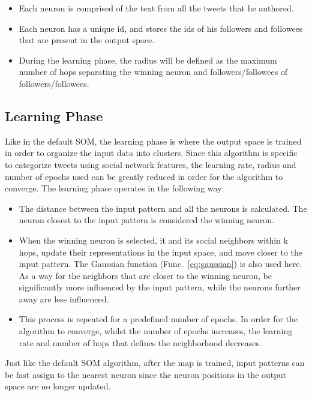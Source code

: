 \begin{itemize}
  \item Each neuron is comprised of the text from all the tweets that he authored.
  \item Each neuron has a unique id, and stores the ids of his followers and followees that are present in the output space.
  \item During the learning phase, the radius will be defined as the maximum number of hops separating the winning neuron and followers/followees of followers/followees. 
\end{itemize}


\subsection{Learning Phase}
\label{sub:learning_phase}
Like in the default \ac{SOM}, the learning phase is where the output space is trained in order to organize the input data into clusters. Since this algorithm is specific to categorize tweets using social network features, the learning rate, radius and number of epochs used can be greatly reduced in order for the algorithm to converge. The learning phase operates in the following way:

\begin{itemize}
  \item The distance between the input pattern and all the neurons is calculated. The neuron closest to the input pattern is considered the winning neuron.
  \item When the winning neuron is selected, it and its social neighbors within k hops, update their representations in the input space, and move closer to the input pattern. The Gaussian function (Func.~\ref{eq:gaussian}) is also used here. As a way for the neighbors that are closer to the winning neuron, be significantly more influenced by the input pattern, while the neurons further away are less influenced. 
  \item This process is repeated for a predefined number of epochs. In order for the algorithm to converge, whilst the number of epochs increases, the learning rate and number of hops that defines the neighborhood decreases.
\end{itemize}

Just like the default \ac{SOM} algorithm, after the map is trained, input patterns can be fast assign to the nearest neuron since the neuron positions in the output space are no longer updated.

